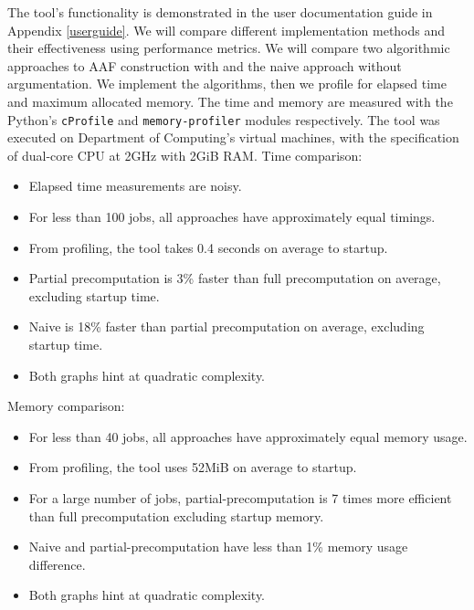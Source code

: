 The tool's functionality is demonstrated in the user documentation guide in Appendix \ref{userguide}. We will compare different implementation methods and their effectiveness using performance metrics. We will compare two algorithmic approaches to AAF construction with and the naive approach without argumentation. We implement the algorithms, then we profile for elapsed time and maximum allocated memory. The time and memory are measured with the Python's \texttt{cProfile} and \texttt{memory-profiler} modules respectively. The tool was executed on Department of Computing's virtual machines, with the specification of dual-core CPU at 2GHz with 2GiB RAM.
\linespace
Time comparison:
\begin{itemize}
	\item Elapsed time measurements are noisy.
	\item For less than 100 jobs, all approaches have approximately equal timings.
	\item From profiling, the tool takes 0.4 seconds on average to startup.
	\item Partial precomputation is 3\% faster than full precomputation on average, excluding startup time.
	\item Naive is 18\% faster than partial precomputation on average, excluding startup time.
	\item Both graphs hint at quadratic complexity.
\end{itemize}

Memory comparison:
\begin{itemize}
	\item For less than 40 jobs, all approaches have approximately equal memory usage.
	\item From profiling, the tool uses 52MiB on average to startup.
	\item For a large number of jobs, partial-precomputation is 7 times more efficient than full precomputation excluding startup memory.
	\item Naive and partial-precomputation have less than 1\% memory usage difference.
	\item Both graphs hint at quadratic complexity.
\end{itemize}

\newpage

